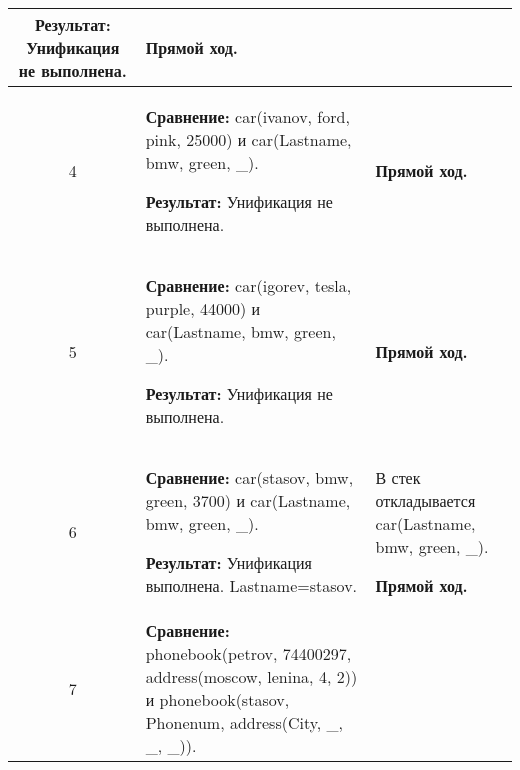 \begin{longtable}{|c|p{}|p{}|}
    \textbf{Результат:} \newline
    Унификация не выполнена.
                       &
    \textbf{Прямой ход.}
                       \\ \hline

    4
                       &
    \textbf{Сравнение:} \newline
  car(ivanov, ford,    pink,   25000)
    \newline и \newline
    car(Lastname, bmw, green, \_).
    \newline

    \textbf{Результат:} \newline
    Унификация не выполнена.
                       &
    \textbf{Прямой ход.}
                       \\ \hline

    5
                       &
    \textbf{Сравнение:} \newline
  car(igorev, tesla,   purple, 44000)
    \newline и \newline
    car(Lastname, bmw, green, \_).
    \newline

    \textbf{Результат:} \newline
    Унификация не выполнена.
                       &
    \textbf{Прямой ход.}
                       \\ \hline

    6
                       &
\textbf{Сравнение:} \newline
  car(stasov, bmw,     green,  3700)
    \newline и \newline
    car(Lastname, bmw, green, \_).
    \newline

    \textbf{Результат:} \newline
    Унификация выполнена.\newline{}
    Lastname=stasov.
                       &
    В стек откладывается\newline
    car(Lastname, bmw, green, \_).
    \newline

    \textbf{Прямой ход.}
                       \\ \hline

    7
                       &
\textbf{Сравнение:} \newline
  phonebook(petrov, 74400297,
            address(moscow,    lenina,       4,  2))
    \newline и \newline
    phonebook(stasov, Phonenum, address(City, \_, \_, \_)).
    \newline


\end{longtable}
